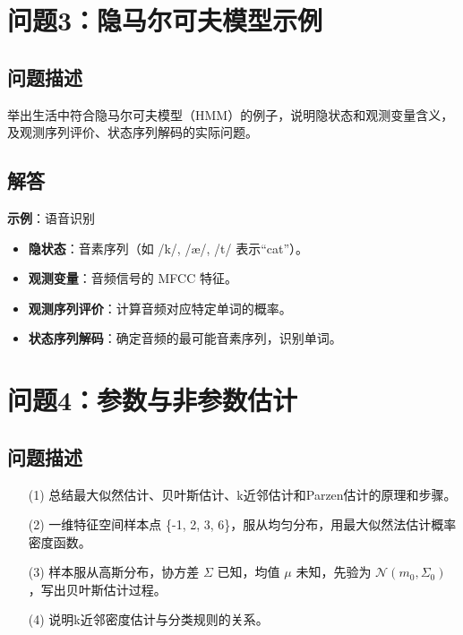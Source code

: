 \documentclass[UTF8]{report}
\theoremstyle{MyLineTheoremStyle} %
\theoremstyle{MyBlockTheoremStyle} %
\theoremstyle{MySubsubsectionStyle} %
\begin{document}
\section{问题3：隐马尔可夫模型示例}

\subsection{问题描述}
举出生活中符合隐马尔可夫模型（HMM）的例子，说明隐状态和观测变量含义，及观测序列评价、状态序列解码的实际问题。

\subsection{解答}
\textbf{示例}：语音识别  
\begin{itemize}
    \item \textbf{隐状态}：音素序列（如 /k/, /æ/, /t/ 表示“cat”）。
    \item \textbf{观测变量}：音频信号的 MFCC 特征。
    \item \textbf{观测序列评价}：计算音频对应特定单词的概率。
    \item \textbf{状态序列解码}：确定音频的最可能音素序列，识别单词。
\end{itemize}

\section{问题4：参数与非参数估计}

\subsection{问题描述}
\begin{enumerate}
    \item[(1)] 总结最大似然估计、贝叶斯估计、k近邻估计和Parzen估计的原理和步骤。
    \item[(2)] 一维特征空间样本点 \{-1, 2, 3, 6\}，服从均匀分布，用最大似然法估计概率密度函数。
    \item[(3)] 样本服从高斯分布，协方差 \(\Sigma\) 已知，均值 \(\mu\) 未知，先验为 \(\mathcal{N}(m_0, \Sigma_0)\)，写出贝叶斯估计过程。
    \item[(4)] 说明k近邻密度估计与分类规则的关系。
\end{enumerate}
\end{document}
